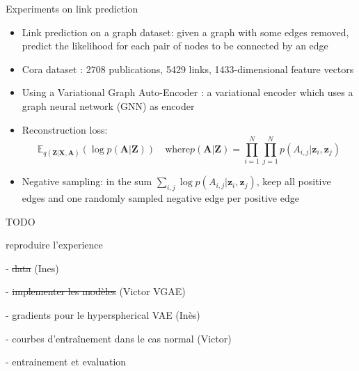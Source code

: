 \begin{frame}{Experiments on link prediction}

  \begin{itemize}
    \item Link prediction on a graph dataset: given a graph with some edges removed, predict the likelihood
    for each pair of nodes to be connected by an edge
    \item Cora dataset \cite{McCallum_2000}: 2708 publications, 5429 links, 1433-dimensional feature vectors
    \item Using a Variational Graph Auto-Encoder \cite{kipf_variational_2016}: a variational encoder which uses a
    graph neural network (GNN) as encoder
    \item Reconstruction loss:
        $$ \mathbb{E}_{q(\mathbf{Z}|\mathbf{X}, \mathbf{A})}(\log p(\mathbf{A}|\mathbf{Z})) \quad 
        \text{where} p(\mathbf{A}|\mathbf{Z}) = \prod_{i = 1}^N \prod_{j=1}^N p(A_{i, j}|\mathbf{z}_i, \mathbf{z}_j) $$
    \item Negative sampling: in the sum $\sum_{i, j} \log p(A_{i, j}|\mathbf{z}_i, \mathbf{z}_j)$, keep all
    positive edges and one randomly sampled negative edge per positive edge
  \end{itemize}
\end{frame}

\begin{frame}{TODO}

    reproduire l'experience 
  
    - \sout{data} (Ines)
  
    - \sout{implementer les modèles} (Victor VGAE)
    
    - gradients pour le hyperspherical VAE (Inès)
    
    - courbes d'entraînement dans le cas normal (Victor)
  
    - entrainement et evaluation 
  
  \end{frame}